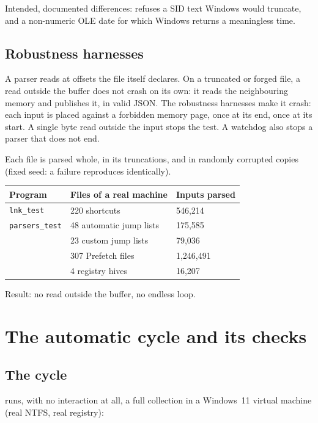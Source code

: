 \documentclass[11pt,a4paper,oneside]{report}
\begin{document}
Intended, documented differences: \wac{} refuses a SID text Windows would
truncate, and a non-numeric OLE date for which Windows returns a meaningless
time.

\section{Robustness harnesses}

A parser reads at offsets the file itself declares. On a truncated or forged
file, a read outside the buffer does not crash on its own: it reads the
neighbouring memory and publishes it, in valid JSON. The robustness harnesses
make it crash: each input is placed against a forbidden memory page, once at
its end, once at its start. A single byte read outside the input stops the
test. A watchdog also stops a parser that does not end.

Each file is parsed whole, in its truncations, and in randomly corrupted copies
(fixed seed: a failure reproduces identically).

\begin{longtable}{@{}L{4.2cm}L{6.4cm}L{4.4cm}@{}}
\toprule
\textbf{Program} & \textbf{Files of a real machine} & \textbf{Inputs parsed} \\
\midrule
\endhead
\texttt{lnk\_test} & 220 shortcuts & 546,214 \\
\texttt{parsers\_test} & 48 automatic jump lists & 175,585 \\
 & 23 custom jump lists & 79,036 \\
 & 307 Prefetch files & 1,246,491 \\
 & 4 registry hives & 16,207 \\
\bottomrule
\end{longtable}

Result: no read outside the buffer, no endless loop.

\chapter{The automatic cycle and its checks}\label{ch:cycle}

\section{The cycle}

 runs, with no interaction at all, a full
collection in a Windows~11 virtual machine (real NTFS, real registry):
\end{document}
